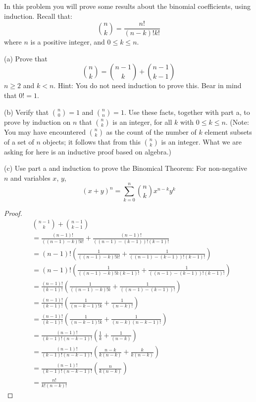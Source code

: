 \documentclass[8pt]{article}
\begin{document}
\begin{tcolorbox}[title=Problem 14, breakable]
    In this problem you will prove some results about the binomial coefficients, using induction.
    Recall that:
    \[\binom{n}{k} = \frac{n!}{(n - k)!k!}\]
    where $n$ is a positive integer, and $0 \le k \le n$.

    (a) Prove that 
    \[\binom{n}{k} = \binom{n - 1}{k} + \binom{n - 1}{k - 1}\]
    $n \ge 2$ and $k < n$. Hint: You do not need induction to prove this.
    Bear in mind that $0! = 1$.

    (b) Verify that $\binom{n}{0} = 1$ and $\binom{n}{n} = 1$. Use these facts,
    together with part a, to prove by induction on $n$ that $\binom{n}{k}$ is an integer,
    for all $k$ with $0 \le k \le n$. (Note: You may have encountered $\binom{n}{k}$ as the 
    count of the number of $k$ element subsets of a set of $n$ objects; it follows that from this 
    $\binom{n}{k}$ is an integer. What we are asking for here is an inductive proof based on algebra.)

    (c) Use part a and induction to prove the Binomical Theorem: For non-negative $n$ and variables $x$, $y$,
    \[{(x + y)}^n = \sum_{k = 0}^{n} \binom{n}{k}x^{n - k}y^k\]
\end{tcolorbox}

\begin{proof}
    \begin{align*}
         & \binom{n - 1}{k} + \binom{n - 1}{k - 1}                                                             \\
         & = \frac{(n - 1)!}{((n - 1) - k)!k!} + \frac{(n - 1)!}{((n - 1) - (k - 1))!(k - 1)!}                 \\
         & =  (n - 1)!\left(\frac{1}{((n - 1) - k)!k!} + \frac{1}{((n - 1) - (k - 1))!(k - 1)!}\right)         \\
         & =  (n - 1)!\left(\frac{1}{((n - 1) - k)!k(k - 1)!} + \frac{1}{((n - 1) - (k - 1))!(k - 1)!}\right)  \\
         & =  \frac{(n - 1)!}{(k - 1)!}\left(\frac{1}{((n - 1) - k)!k} + \frac{1}{((n - 1) - (k - 1))!}\right) \\
         & =  \frac{(n - 1)!}{(k - 1)!}\left(\frac{1}{(n - k - 1)!k} + \frac{1}{(n - k)!}\right)               \\
         & =  \frac{(n - 1)!}{(k - 1)!}\left(\frac{1}{(n - k - 1)!k} + \frac{1}{(n - k)(n - k - 1)!}\right)    \\
         & =  \frac{(n - 1)!}{(k - 1)!(n - k - 1)!}\left(\frac{1}{k} + \frac{1}{(n - k)}\right)                \\
         & =  \frac{(n - 1)!}{(k - 1)!(n - k - 1)!}\left(\frac{n - k}{k(n - k)} + \frac{k}{k(n - k)}\right)    \\
         & =  \frac{(n - 1)!}{(k - 1)!(n - k - 1)!}\left(\frac{n}{k(n - k)}\right)                             \\
         & =  \frac{n!}{k!(n - k)!}
    \end{align*}
\end{proof}
\end{document}
